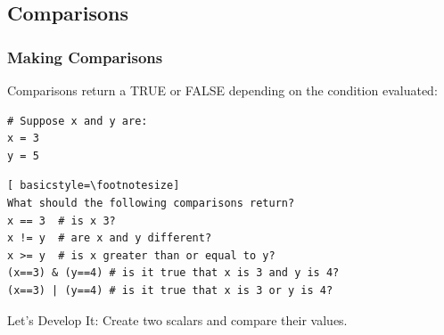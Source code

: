 \subsection{Comparisons}
\begin{frame}
\frametitle{Making Comparisons}
Comparisons return a TRUE or FALSE depending on the condition evaluated:
			\begin{lstlisting}
# Suppose x and y are:
x = 3
y = 5
			\end{lstlisting}
			\begin{lstlisting}[ basicstyle=\footnotesize]
What should the following comparisons return?
x == 3  # is x 3?
x != y  # are x and y different?
x >= y  # is x greater than or equal to y?
(x==3) & (y==4) # is it true that x is 3 and y is 4?
(x==3) | (y==4) # is it true that x is 3 or y is 4?
			\end{lstlisting}	
\newpage
	\begin{alertblock}{Let's Develop It:}
		Create two scalars and compare their values.
	\end{alertblock}			
\end{frame}

